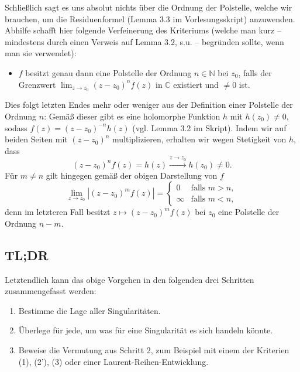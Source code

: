 \documentclass{article}
\theoremstyle{plain}
\theoremstyle{definition}
\begin{document}
Schließlich sagt es uns absolut nichts über die Ordnung der Polstelle, welche wir brauchen, um die Residuenformel (Lemma 3.3 im Vorlesungsskript) anzuwenden.
Abhilfe schafft hier folgende Verfeinerung des Kriteriums (welche man kurz -- mindestens durch einen Verweis auf Lemma 3.2, s.u. -- begründen sollte, wenn man sie verwendet):
\begin{tcolorbox}
	\begin{itemize}
		\item[(2')] $f$ besitzt genau dann eine Polstelle der Ordnung $n \in \mathbb{N}$ bei $z_0$, falls der Grenzwert $\lim_{z \to z_0} (z - z_0)^n f(z)$ in $\mathbb{C}$ existiert und $\neq 0$ ist.
	\end{itemize}
\end{tcolorbox}
Dies folgt letzten Endes mehr oder weniger aus der Definition einer Polstelle der Ordnung $n$: Gemäß dieser gibt es eine holomorphe Funktion $h$ mit $h(z_0) \neq 0$, sodass $f(z) = (z - z_0)^{-n} h(z)$ (vgl. Lemma 3.2 im Skript).
Indem wir auf beiden Seiten mit $(z - z_0)^{n}$ multiplizieren, erhalten wir wegen Stetigkeit von $h$, dass
\[
	(z - z_0)^n f(z) = h(z) \overset{z \to z_0}{\longrightarrow} h(z_0) \neq 0.
\]
Für $m \neq n$ gilt hingegen gemäß der obigen Darstellung von $f$
\[
	\lim_{z \to z_0} |(z - z_0)^m f(z)| = \begin{cases} 0 & \text{falls } m > n , \\ \infty & \text{falls } m < n, \end{cases}
\]
denn im letzteren Fall besitzt $z \mapsto (z - z_0)^m f(z)$ bei $z_0$ eine Polstelle der Ordnung $n - m$.

\subsection{TL;DR}

Letztendlich kann das obige Vorgehen in den folgenden drei Schritten zusammengefasst werden:
\begin{tcolorbox}
	\begin{enumerate}
		\item Bestimme die Lage aller Singularitäten.
		\item Überlege für jede, um was für eine Singularität es sich handeln könnte.
		\item Beweise die Vermutung aus Schritt 2, zum Beispiel mit einem der Kriterien (1), (2'), (3) oder einer Laurent-Reihen-Entwicklung.
	\end{enumerate}
\end{tcolorbox}
\end{document}
